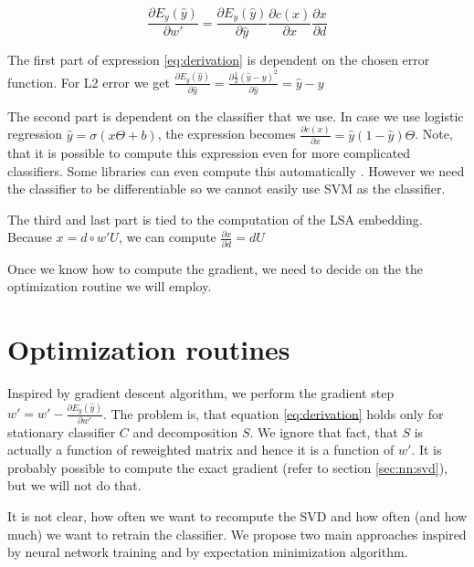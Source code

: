     \begin{equation} \label{eq:derivation}
    \frac{\partial E_y(\hat{y})}{\partial w'} = \frac{\partial E_y(\hat{y})}{\partial \hat{y}} \frac{\partial c(x)}{\partial x} \frac{\partial x}{\partial d}
    \end{equation}
    
    The first part of expression \ref{eq:derivation} is dependent on the chosen error function. 
    For L2 error we get 
    $\frac{\partial E_y(\hat{y})}{\partial \hat{y}} = \frac{\partial \frac{1}{2}(\hat{y}-y)^2}{\partial \hat{y}} = \hat{y}-y$
    
    The second part is dependent on the classifier that we use. 
    In case we use logistic regression $\hat{y} = \sigma(x \Theta + b)$, the expression becomes
    $\frac{\partial c(x)}{\partial x} = \hat{y} (1-\hat{y}) \Theta$.
    Note, that it is possible to compute this expression even for more complicated classifiers. 
    Some libraries can even compute this automatically \cite{tensorflow2015-whitepaper}.
    However we need the classifier to be differentiable so we cannot easily use SVM as the classifier. 
    
    The third and last part is tied to the computation of the LSA embedding.
    Because $x = d \circ w' U$, we can compute 
    $\frac{\partial x}{\partial d} = d U$ 
    \* %
    \* %
    
    Once we know how to compute the gradient, we need to decide on the the optimization routine we will employ.

\section{Optimization routines}
    
    Inspired by gradient descent algorithm, we perform the gradient step $w' = w' - \frac{\partial E_y(\hat{y})}{\partial w'}$. 
    The problem is, that equation \ref{eq:derivation} holds only for stationary classifier $C$ and decomposition $S$. 
    We ignore that fact, that $S$ is actually a function of reweighted matrix and hence it is a function of $w'$.
    It is probably possible to compute the exact gradient (refer to section \ref{sec:nn:svd}), but we will not do that.
    
    It is not clear, how often we want to recompute the SVD and how often (and how much) we want to retrain the classifier.
    We propose two main approaches inspired by neural network training and by 
    expectation minimization algorithm.
    
